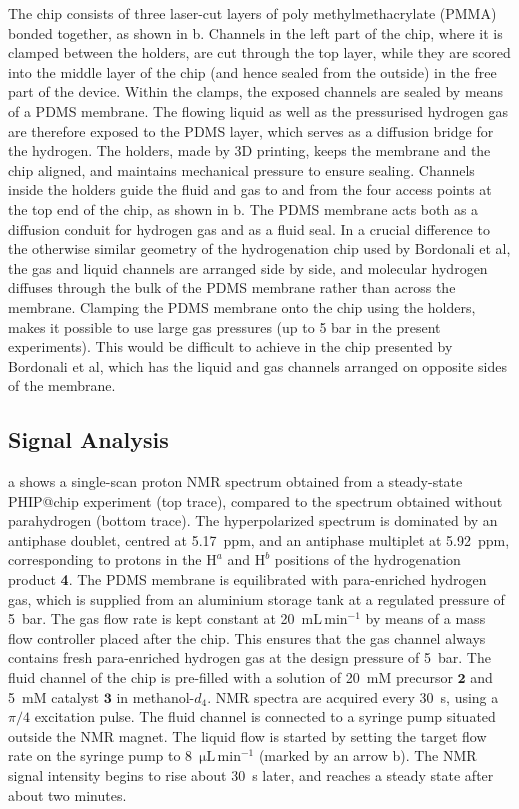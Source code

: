 The chip consists of three laser-cut layers of poly methylmethacrylate (PMMA)
bonded together, as shown in b. Channels in the
left part of the chip, where it is clamped between the holders, are cut through
the top layer, while they are scored into the middle layer of the chip (and
hence sealed from the outside) in the free part of the device.
Within the clamps, the exposed channels are sealed by means of a PDMS membrane.
The flowing liquid as well as
the pressurised hydrogen gas are therefore exposed to the PDMS layer,
which serves as a diffusion bridge for the hydrogen.
The holders, made by 3D printing, keeps the membrane and the chip aligned,
and maintains mechanical pressure to ensure sealing. Channels
inside the holders guide the fluid and gas to and from
the four access points at the top end
of the chip, as shown in b.
The PDMS membrane acts both as a diffusion conduit for hydrogen gas
and as a fluid seal.
In a crucial difference to the otherwise similar geometry of the
hydrogenation chip used by Bordonali et al\cite{Bordonali:2019jq},
the gas and liquid channels are arranged side by side, and molecular
hydrogen diffuses through the bulk of the PDMS membrane rather than across the membrane.
Clamping the PDMS membrane onto the chip using the
holders, makes it possible to use large gas pressures (up to 5 bar in
the present experiments). This would be difficult to achieve in the
chip presented by Bordonali et al, which has the liquid and gas channels
arranged on opposite sides of the membrane.

\subsection{Signal Analysis}

a shows a single-scan proton NMR spectrum
obtained from a steady-state PHIP@chip experiment (top trace), compared
to the spectrum obtained without parahydrogen (bottom trace).
The hyperpolarized spectrum is dominated by an antiphase doublet,
centred at 5.17~ppm, and an antiphase multiplet at 5.92~ppm, corresponding to
protons in the $\mathrm{H}^a$ and $\mathrm{H}^b$ positions of the
hydrogenation product \textbf{4}.
The PDMS membrane is equilibrated with para-enriched hydrogen gas, which is
supplied from an aluminium storage tank at a regulated pressure of 5~bar. The
gas flow rate is kept constant at 20~$\text{mL}\,\text{min}^{-1}$ by means of a
mass flow controller placed after the chip. This ensures that the gas channel
always contains fresh para-enriched hydrogen gas at the design pressure of
5~bar. The fluid channel of the chip is pre-filled with a solution of 20~mM
precursor $\mathbf{2}$ and 5~mM catalyst $\mathbf{3}$ in methanol-$d_4$. NMR
spectra are acquired every 30~s, using a $\pi/4$ excitation pulse.  The fluid
channel is connected to a syringe pump situated outside the NMR magnet.
The
liquid flow is started by setting the target flow rate on the syringe pump to
8~$\mathrm{\mu L\,\text{min}^{-1}}$ (marked by an arrow b).
The NMR signal intensity begins to rise about 30~s later, and reaches a steady
state after about two minutes.

